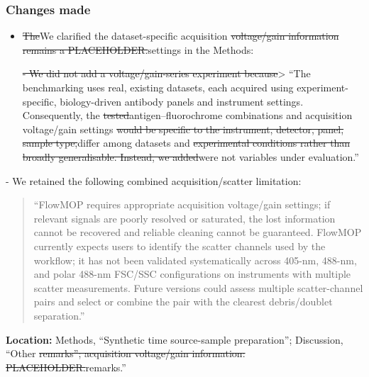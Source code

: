 \documentclass[
  11pt,
  a4paper,
]{article}
\begin{document}
\subsubsection{Changes made}\label{changes-made-7}

\begin{itemize}
\item
  {\color{revisionred}\sout{The}}{\color{revisionblue}We clarified the
  dataset-specific} acquisition {\color{revisionred}\sout{voltage/gain
  information remains a PLACEHOLDER.}}{\color{revisionblue}settings in
  the Methods:}

  {\color{revisionred}\sout{- We did not add a voltage/gain-series
  experiment because}}{\color{revisionblue}\textgreater{} ``The
  benchmarking uses real, existing datasets, each acquired using
  experiment-specific, biology-driven antibody panels and instrument
  settings. Consequently,} the
  {\color{revisionred}\sout{tested}}{\color{revisionblue}antigen--fluorochrome
  combinations and acquisition voltage/gain} settings
  {\color{revisionred}\sout{would be specific to the instrument,
  detector, panel, sample type,}}{\color{revisionblue}differ among
  datasets} and {\color{revisionred}\sout{experimental conditions rather
  than broadly generalisable. Instead, we
  added}}{\color{revisionblue}were not variables under evaluation.''}
\end{itemize}

{\color{revisionblue}- We retained} the following combined
acquisition/scatter limitation:

\begin{quote}
``FlowMOP requires appropriate acquisition voltage/gain settings; if
relevant signals are poorly resolved or saturated, the lost information
cannot be recovered and reliable cleaning cannot be guaranteed. FlowMOP
currently expects users to identify the scatter channels used by the
workflow; it has not been validated systematically across 405-nm,
488-nm, and polar 488-nm FSC/SSC configurations on instruments with
multiple scatter measurements. Future versions could assess multiple
scatter-channel pairs and select or combine the pair with the clearest
debris/doublet separation.''
\end{quote}

\textbf{Location:} {\color{revisionblue}Methods, ``Synthetic time
source-sample preparation'';} Discussion, ``Other
{\color{revisionred}\sout{remarks''; acquisition voltage/gain
information: PLACEHOLDER.}}{\color{revisionblue}remarks.''}
\end{document}
